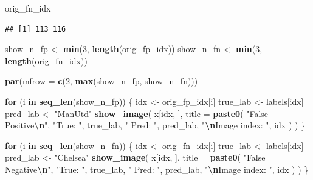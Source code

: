 \documentclass[
]{article}
\newenvironment{Shaded}{\begin{snugshade}}{\end{snugshade}}
\newcommand{\AttributeTok}[1]{\textcolor[rgb]{0.13,0.29,0.53}{#1}}
\newcommand{\ControlFlowTok}[1]{\textcolor[rgb]{0.13,0.29,0.53}{\textbf{#1}}}
\newcommand{\DecValTok}[1]{\textcolor[rgb]{0.00,0.00,0.81}{#1}}
\newcommand{\FunctionTok}[1]{\textcolor[rgb]{0.13,0.29,0.53}{\textbf{#1}}}
\newcommand{\NormalTok}[1]{#1}
\newcommand{\OtherTok}[1]{\textcolor[rgb]{0.56,0.35,0.01}{#1}}
\newcommand{\SpecialCharTok}[1]{\textcolor[rgb]{0.81,0.36,0.00}{\textbf{#1}}}
\newcommand{\StringTok}[1]{\textcolor[rgb]{0.31,0.60,0.02}{#1}}
\begin{document}
\begin{Shaded}
\begin{Highlighting}[]
\NormalTok{orig\_fn\_idx}
\end{Highlighting}
\end{Shaded}

\begin{verbatim}
## [1] 113 116
\end{verbatim}

\begin{Shaded}
\begin{Highlighting}[]
\NormalTok{show\_n\_fp }\OtherTok{\textless{}{-}} \FunctionTok{min}\NormalTok{(}\DecValTok{3}\NormalTok{, }\FunctionTok{length}\NormalTok{(orig\_fp\_idx))}
\NormalTok{show\_n\_fn }\OtherTok{\textless{}{-}} \FunctionTok{min}\NormalTok{(}\DecValTok{3}\NormalTok{, }\FunctionTok{length}\NormalTok{(orig\_fn\_idx))}

\FunctionTok{par}\NormalTok{(}\AttributeTok{mfrow =} \FunctionTok{c}\NormalTok{(}\DecValTok{2}\NormalTok{, }\FunctionTok{max}\NormalTok{(show\_n\_fp, show\_n\_fn)))}

\ControlFlowTok{for}\NormalTok{ (i }\ControlFlowTok{in} \FunctionTok{seq\_len}\NormalTok{(show\_n\_fp)) \{}
\NormalTok{idx }\OtherTok{\textless{}{-}}\NormalTok{ orig\_fp\_idx[i]}
\NormalTok{true\_lab }\OtherTok{\textless{}{-}}\NormalTok{ labels[idx]}
\NormalTok{pred\_lab }\OtherTok{\textless{}{-}} \StringTok{"ManUtd"}
\FunctionTok{show\_image}\NormalTok{(}
\NormalTok{x[idx, ],}
\AttributeTok{title =} \FunctionTok{paste0}\NormalTok{(}
\StringTok{"False Positive}\SpecialCharTok{\textbackslash{}n}\StringTok{"}\NormalTok{,}
\StringTok{"True: "}\NormalTok{, true\_lab, }\StringTok{"  Pred: "}\NormalTok{, pred\_lab,}
\StringTok{"}\SpecialCharTok{\textbackslash{}n}\StringTok{Image index: "}\NormalTok{, idx}
\NormalTok{)}
\NormalTok{)}
\NormalTok{\}}

\ControlFlowTok{for}\NormalTok{ (i }\ControlFlowTok{in} \FunctionTok{seq\_len}\NormalTok{(show\_n\_fn)) \{}
\NormalTok{idx }\OtherTok{\textless{}{-}}\NormalTok{ orig\_fn\_idx[i]}
\NormalTok{true\_lab }\OtherTok{\textless{}{-}}\NormalTok{ labels[idx]}
\NormalTok{pred\_lab }\OtherTok{\textless{}{-}} \StringTok{"Chelsea"}
\FunctionTok{show\_image}\NormalTok{(}
\NormalTok{x[idx, ],}
\AttributeTok{title =} \FunctionTok{paste0}\NormalTok{(}
\StringTok{"False Negative}\SpecialCharTok{\textbackslash{}n}\StringTok{"}\NormalTok{,}
\StringTok{"True: "}\NormalTok{, true\_lab, }\StringTok{"  Pred: "}\NormalTok{, pred\_lab,}
\StringTok{"}\SpecialCharTok{\textbackslash{}n}\StringTok{Image index: "}\NormalTok{, idx}
\NormalTok{)}
\NormalTok{)}
\NormalTok{\}}
\end{Highlighting}
\end{Shaded}
\end{document}
